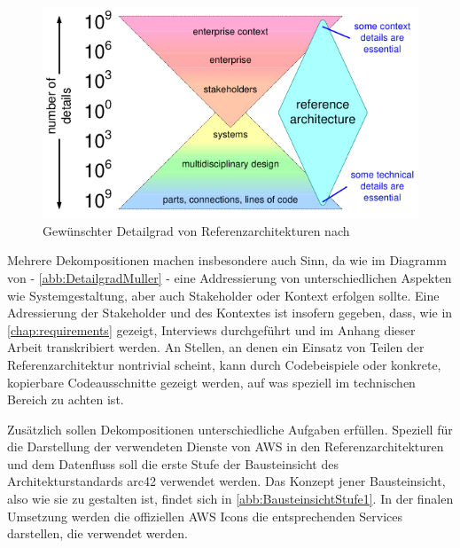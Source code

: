 \begin{figure}[H]
\centering
\includegraphics[height=0.23\textheight]{graphics/reference-architecture-details.pdf}
\caption[Gewünschter Detailgrad von Referenzarchitekturen nach \citeauthor{Muller.2020}]{Gewünschter Detailgrad von Referenzarchitekturen nach \citeauthor{Muller.2020}\footnotemark}
\label{abb:DetailgradMuller}
\end{figure}

Mehrere Dekompositionen machen insbesondere auch Sinn, da wie im Diagramm von \citeauthor{Muller.2020} - \autoref{abb:DetailgradMuller} - eine Addressierung von unterschiedlichen Aspekten wie Systemgestaltung, aber auch Stakeholder oder Kontext erfolgen sollte. Eine Adressierung der Stakeholder und des Kontextes ist insofern gegeben, dass, wie in \autoref{chap:requirements} gezeigt, Interviews durchgeführt und im Anhang dieser Arbeit transkribiert werden. An Stellen, an denen ein Einsatz von Teilen der Referenzarchitektur nontrivial scheint, kann durch Codebeispiele oder konkrete, kopierbare Codeausschnitte gezeigt werden, auf was speziell im technischen Bereich zu achten ist.

Zusätzlich sollen Dekompositionen unterschiedliche Aufgaben erfüllen. Speziell für die Darstellung der verwendeten Dienste von \ac{AWS} in den Referenzarchitekturen und dem Datenfluss soll die erste Stufe der Bausteinsicht des Architekturstandards arc42 verwendet werden. Das Konzept jener Bausteinsicht, also wie sie zu gestalten ist, findet sich in \autoref{abb:BausteinsichtStufe1}. In der finalen Umsetzung werden die offiziellen \ac{AWS} Icons die entsprechenden Services darstellen, die verwendet werden.

